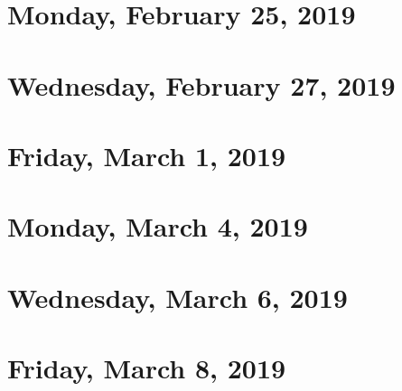\documentclass[reqno]{amsart}
\begin{document}
\section{Monday, February 25, 2019}
    

\section{Wednesday, February 27, 2019}
    

\section{Friday, March 1, 2019}
    

\section{Monday, March 4, 2019}
    

\section{Wednesday, March 6, 2019}
    

\section{Friday, March 8, 2019}
    
\end{document}
